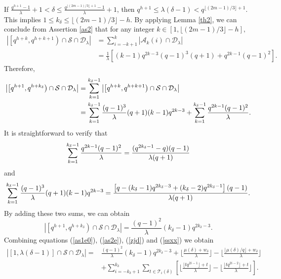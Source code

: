 \documentclass[journal,onecolumn]{IEEEtran}
\begin{document}
If   $\frac{q^{h+1}-1}{\lambda}+1<\delta\leq \frac{q^{\lfloor (2m-1)/3\rfloor+1}-1}{\lambda}+1$,  then 
$q^{h+1}\leq \lambda(\delta-1)<  q^{\lfloor (2m-1)/3\rfloor+1}$. This  implies  $1\leq k_{\delta}\leq \lfloor(2m-1)/{3} \rfloor-h$. 
By applying Lemma  \ref{th2}, we can conclude from  Assertion \ref{as2} that 
 for any integer $ k\in \left[1,  \lfloor ({2m-1})/{3}\rfloor-h\right],$ 
\begin{equation}
  \begin{split}
 \left|\left[q^{h+k}, q^{h+k+1} \right)\cap \mathcal{S}\cap \mathcal{D}_{\lambda}\right| 
&=\sum\limits_{i=-k+1}^k\left |\mathcal{A}_k(i)\cap \mathcal{D}_{\lambda}\right|  \\
&=  \frac{1}{\lambda}\left[(k-1)q^{2k-3}(q-1)^3(q+1) \nonumber + q^{2k-1}(q-1)^2\right]. 
 \end{split}  
\end{equation}
Therefore, 
\begin{equation}\notag
\begin{split}
\left|\left[q^{h+1},q^{h+k_{\delta}}\right)\cap \mathcal{S}\cap \mathcal{D}_{\lambda}\right|  & =  \sum\limits_{{k}=1}^{k_{\delta}-1}
\left|\left[q^{h+{k}},q^{h+{k}+1}\right)\cap \mathcal{S}\cap \mathcal{D}_{\lambda}\right|  \\ 
&=\sum\limits_{{k}=1}^{k_{\delta}-1}\frac{(q-1)^3}{\lambda}(q+1)({k}-1) q^{2{k}-3}+ \sum\limits_{{k}=1}^{k_{\delta}-1}\frac{q^{2{k}-1}(q-1)^2}{\lambda}.
\end{split}
\end{equation}
It is straightforward  to verify  that 
\begin{equation}\notag
\sum\limits_{{k}=1}^{k_{\delta}-1}\frac{q^{2{k}-1}(q-1)^2}{\lambda}=\frac{(q^{2{k_{\delta}}-1}-q)(q-1)}{\lambda(q+1)}
\end{equation}
and 
\begin{equation}\notag
   \sum\limits_{k=1}^{k_{\delta}-1}\frac{(q-1)^3}{\lambda}(q+1)({k}-1)q^{2{k}-3}=  \frac{\left[q-(k_{\delta}-1)q^{2k_{\delta}-3}+(k_{\delta}-2)q^{2k_{\delta}-1}\right](q-1)}{\lambda(q+1)}.
\end{equation}
By adding these two sums,  we can obtain 
\begin{equation}\label{ssxx}
\left|\left[q^{h+1},q^{h+k_{\delta}}\right)\cap \mathcal{S}\cap \mathcal{D}_{\lambda}\right| =\frac{ (q-1)^2}{\lambda}(k_{\delta}-1)q^{2k_{\delta}-3}.
\end{equation}
Combining equations (\ref{as1e0}), 
(\ref{as2e}), 
(\ref{zjd}) and 
(\ref{ssxx})   we obtain 
\begin{equation}
\begin{split}
\left|\left[1,\lambda(\delta-1)\right]\cap \mathcal{S}\cap \mathcal{D}_{\lambda}\right| 
 = &\frac{ (q-1)^2}{\lambda}(k_{\delta}-1)q^{2k_{\delta}-3}+\lfloor \frac{\mu(\delta)+w_{\delta}}{\lambda}\rfloor -\lfloor \frac{\lfloor \mu(\delta)/q\rfloor+w_{\delta}}{\lambda}\rfloor   \nonumber \\& +  \sum\limits_{i=-k_{\delta}+1}^{k_{\delta}}\sum\limits_{t\in \mathcal{T}_i(\delta)} \left [\lfloor \frac{\lfloor tq^{2i-1}\rfloor+t}{\lambda}\rfloor -\lfloor \frac{\lfloor tq^{2i-2}\rfloor+t}{\lambda}\rfloor \right]. 
  \end{split}
\end{equation}
\end{document}
